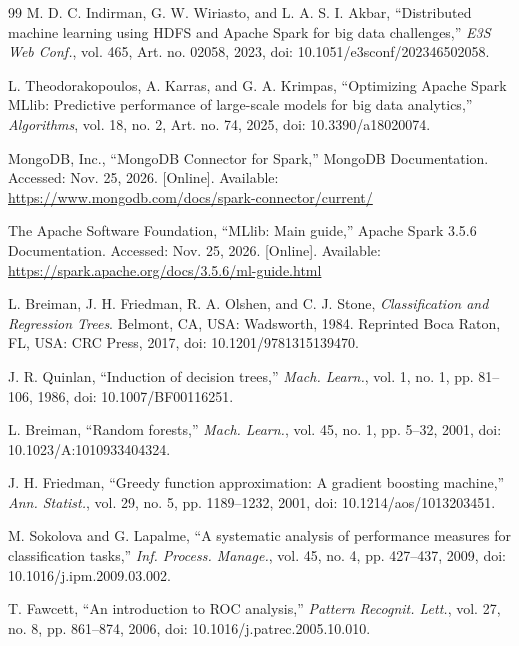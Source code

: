 \documentclass[11pt,a4paper]{article}
\begin{document}
\begin{thebibliography}{99}
 M. D. C. Indirman, G. W. Wiriasto, and L. A. S. I. Akbar,
``Distributed machine learning using HDFS and Apache Spark for big data challenges,''
\emph{E3S Web Conf.}, vol. 465, Art. no. 02058, 2023, doi: 10.1051/e3sconf/202346502058.

 L. Theodorakopoulos, A. Karras, and G. A. Krimpas,
``Optimizing Apache Spark MLlib: Predictive performance of large-scale models for big data
analytics,'' \emph{Algorithms}, vol. 18, no. 2, Art. no. 74, 2025,
doi: 10.3390/a18020074.

 MongoDB, Inc., ``MongoDB Connector for Spark,'' MongoDB
Documentation. Accessed: Nov. 25, 2026. [Online]. Available:
\url{https://www.mongodb.com/docs/spark-connector/current/}

 The Apache Software Foundation, ``MLlib: Main guide,'' Apache Spark
3.5.6 Documentation. Accessed: Nov. 25, 2026. [Online]. Available:
\url{https://spark.apache.org/docs/3.5.6/ml-guide.html}

 L. Breiman, J. H. Friedman, R. A. Olshen, and C. J. Stone,
\emph{Classification and Regression Trees}. Belmont, CA, USA: Wadsworth, 1984. Reprinted
Boca Raton, FL, USA: CRC Press, 2017, doi: 10.1201/9781315139470.

 J. R. Quinlan, ``Induction of decision trees,'' \emph{Mach. Learn.},
vol. 1, no. 1, pp. 81--106, 1986, doi: 10.1007/BF00116251.

 L. Breiman, ``Random forests,'' \emph{Mach. Learn.}, vol. 45, no. 1,
pp. 5--32, 2001, doi: 10.1023/A:1010933404324.

 J. H. Friedman, ``Greedy function approximation: A gradient boosting
machine,'' \emph{Ann. Statist.}, vol. 29, no. 5, pp. 1189--1232, 2001,
doi: 10.1214/aos/1013203451.

 M. Sokolova and G. Lapalme, ``A systematic analysis of performance
measures for classification tasks,'' \emph{Inf. Process. Manage.}, vol. 45, no. 4,
pp. 427--437, 2009, doi: 10.1016/j.ipm.2009.03.002.

 T. Fawcett, ``An introduction to ROC analysis,'' \emph{Pattern
Recognit. Lett.}, vol. 27, no. 8, pp. 861--874, 2006, doi: 10.1016/j.patrec.2005.10.010.
\end{thebibliography}
\end{document}
